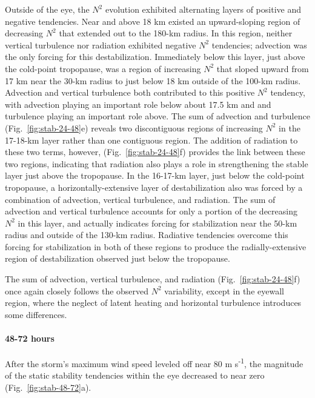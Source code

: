 \documentclass{ametsoc}
\begin{document}
Outside of the eye, the $N^2$ evolution exhibited alternating layers of positive and negative tendencies.
Near and above 18 km existed an upward-sloping region of decreasing $N^2$ that extended out to the 180-km radius.
In this region, neither vertical turbulence nor radiation exhibited negative $N^2$ tendencies; advection was the only forcing for this destabilization.
Immediately below this layer, just above the cold-point tropopause, was a region of increasing $N^2$ that sloped upward from 17 km near the 30-km radius to just below 18 km outside of the 100-km radius.
Advection and vertical turbulence both contributed to this positive $N^2$ tendency, with advection playing an important role below about 17.5 km and and turbulence playing an important role above.
The sum of advection and turbulence (Fig.~\ref{fig:stab-24-48}e) reveals two discontiguous regions of increasing $N^2$ in the 17-18-km layer rather than one contiguous region.
The addition of radiation to these two terms, however, (Fig.~\ref{fig:stab-24-48}f) provides the link between these two regions, indicating that radiation also plays a role in strengthening the stable layer just above the tropopause.
In the 16-17-km layer, just below the cold-point tropopause, a horizontally-extensive layer of destabilization also was forced by a combination of advection, vertical turbulence, and radiation.
The sum of advection and vertical turbulence accounts for only a portion of the decreasing $N^2$ in this layer, and actually indicates forcing for stabilization near the 50-km radius and outside of the 130-km radius.
Radiative tendencies overcome this forcing for stabilization in both of these regions to produce the radially-extensive region of destabilization observed just below the tropopause.

The sum of advection, vertical turbulence, and radiation (Fig.~\ref{fig:stab-24-48}f) once again closely follows the observed $N^2$ variability, except in the eyewall region, where the neglect of latent heating and horizontal turbulence introduces some differences.

\paragraph{48-72 hours}
After the storm's maximum wind speed leveled off near 80 m s\textsuperscript{-1}, the magnitude of the static stability tendencies within the eye decreased to near zero (Fig.~\ref{fig:stab-48-72}a).
\end{document}
